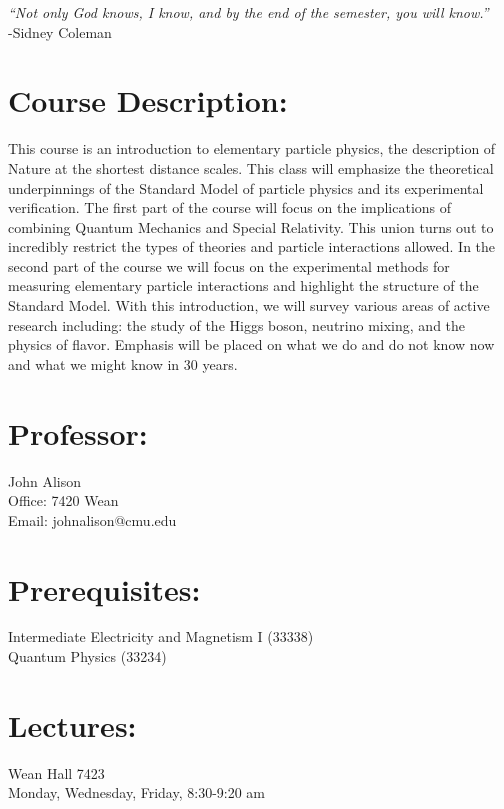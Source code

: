 \documentclass[margin,line]{res}
\begin{document}


\begin{resume}
{ \textit{\large``Not only God knows, I know, and by the end of the semester, you will know.''}\\ \hspace*{5in} -Sidney Coleman}

\section{Course Description:}
This course is an introduction to elementary particle physics, the description of Nature at the shortest distance scales. 
This class will emphasize the theoretical underpinnings of the Standard Model of particle physics and its experimental verification.
The first part of the course will focus on the implications of combining Quantum Mechanics and Special Relativity.
This union turns out to incredibly restrict the types of theories and particle interactions allowed.
In the second part of the course we will focus on the experimental methods for measuring elementary particle interactions and highlight the structure of the Standard Model.
With this introduction, we will survey various areas of active research including: the study of the Higgs boson, neutrino mixing, and the physics of flavor. 
Emphasis will be placed on what we do and do not know now and what we might know in 30 years.


\section{Professor:}
John Alison\\
Office: 7420 Wean\\
Email: johnalison@cmu.edu

\section{Prerequisites:} 
Intermediate Electricity and Magnetism I (33338)\\
Quantum Physics (33234)

\section{Lectures:}
Wean Hall 7423\\
 Monday, Wednesday,  Friday, 8:30-9:20 am 


\end{resume}
\end{document}
